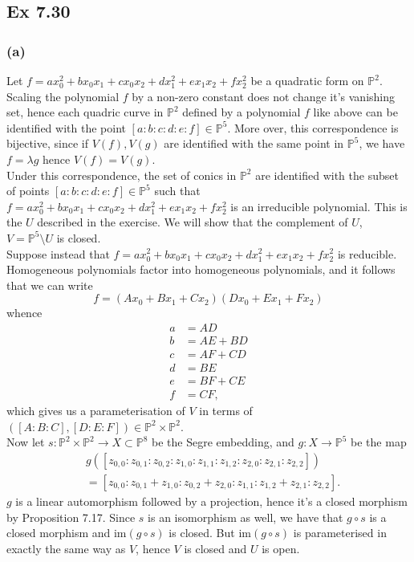 \documentclass{article}
\theoremstyle{definition}
\renewcommand{\P}{\mathbb{P}}
\newcommand{\PP}[1]{\P^{#1}}
\newcommand{\im}{\text{im}}
\begin{document}
\subsection*{Ex 7.30}

\subsubsection*{(a)}

Let $f = ax_0^{2} + bx_0x_1 + cx_0x_2 + dx_1^{2} + ex_1x_2 + fx_2^{2}$ be a
quadratic form on $\PP{2}$. Scaling the polynomial $f$ by a non-zero constant
does not change it's vanishing set, hence each quadric curve in $\PP{2}$
defined by a polynomial $f$ like above can be identified with the point
$[a:b:c:d:e:f] \in \PP{5}$. More over, this correspondence is bijective, since
if $V(f), V(g)$ are identified with the same point in $\PP{5}$, we have $f =
\lambda g$ hence $V(f) = V(g)$. \\

Under this correspondence, the set of conics in $\PP{2}$ are identified with
the subset of points $[a:b:c:d:e:f] \in \PP{5}$ such that $f = ax_0^{2} +
bx_0x_1 + cx_0x_2 + dx_1^{2} + ex_1x_2 + fx_2^{2}$ is an irreducible
polynomial. This is the $U$ described in the exercise. We will show that the
complement of $U$, $V = \PP{5} \setminus U$ is closed. \\

Suppose instead that $f = ax_0^{2} +
bx_0x_1 + cx_0x_2 + dx_1^{2} + ex_1x_2 + fx_2^{2}$
is reducible. Homogeneous polynomials factor into homogeneous polynomials,
and it follows that we can write
\[
	f 
	= 
	(Ax_0 + Bx_1 + Cx_2)(Dx_0 + Ex_1 + Fx_2)
\]
whence 
\begin{align*}
	a &= AD \\
	b &= AE + BD \\
	c &= AF + CD \\
	d &= BE \\
	e &= BF + CE \\
	f &= CF,
\end{align*}
which gives us a parameterisation of $V$ in terms of $\left([A:B:C], [D:E:F]\right) \in
\PP{2} \times \PP{2}$. \\

Now let $s : \PP{2} \times \PP{2} \to X \subset \PP{8}$ be the Segre embedding,
and $g : X \to \PP{5}$ be the map
\begin{align*}
	&g([z_{0,0}:z_{0,1}:z_{0,2}:z_{1,0}:z_{1,1}:z_{1,2}:z_{2,0}:z_{2,1}:z_{2,2}]) \\
	&=
	[z_{0,0}:z_{0,1}+z_{1,0}:z_{0,2}+z_{2,0}:z_{1,1}:z_{1,2}+z_{2,1}:z_{2,2}].
\end{align*}
$g$ is a linear automorphism followed by a projection, hence it's a closed
morphism by Proposition 7.17. Since $s$ is an isomorphism as well, we have that
$g \circ s$ is a closed morphism and $\im(g \circ s)$ is closed. But $\im(g
\circ s)$ is parameterised in exactly the same way as $V$, hence $V$ is closed
and $U$ is open.
\end{document}
